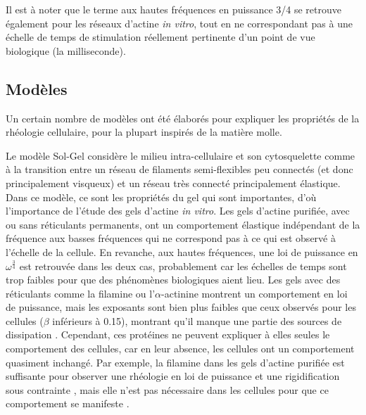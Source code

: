 Il est à noter que le terme aux hautes fréquences en puissance 3/4 se retrouve également pour les réseaux d'actine \textit{in vitro}, tout en ne correspondant pas à une échelle de temps de stimulation réellement pertinente d'un point de vue biologique (la milliseconde). 




\subsection{Modèles}

Un certain nombre de modèles ont été élaborés pour expliquer les propriétés de la rhéologie cellulaire, pour la plupart inspirés de la matière molle. 

Le modèle Sol-Gel considère le milieu intra-cellulaire et son cytosquelette comme à la transition entre un réseau de filaments semi-flexibles peu connectés (et donc principalement visqueux) et un réseau très connecté principalement élastique. 
Dans ce modèle, ce sont les propriétés du gel qui sont importantes,  d'où l'importance de l'étude des gels d'actine \textit{in vitro}. 
Les gels d'actine purifiée, avec ou sans réticulants permanents, ont un comportement élastique indépendant de la fréquence aux basses fréquences qui ne correspond pas à ce qui est observé à l'échelle de la cellule. 
En revanche, aux hautes fréquences, une loi de puissance en $\omega^{\frac{3}{4}}$ est retrouvée dans les deux cas, probablement car les échelles de temps sont trop faibles pour que des phénomènes biologiques aient lieu. 
Les gels avec des réticulants comme la filamine ou l'$\alpha$-actinine montrent un comportement en loi de puissance, mais les exposants sont bien plus faibles que ceux observés pour les cellules ($\beta$ inférieurs à 0.15), montrant qu'il manque une partie des sources de dissipation \parencite{gardel_stress-dependent_2006}.
Cependant, ces protéines ne peuvent expliquer à elles seules le comportement des cellules, car en leur absence, les cellules ont un comportement quasiment inchangé. Par exemple, la filamine dans les gels d'actine purifiée est suffisante pour observer une rhéologie en loi de puissance et une rigidification sous contrainte \parencite{gardel_stress-dependent_2006}, mais elle n'est pas nécessaire dans les cellules pour que ce comportement se manifeste \parencite{coughlin_filamin-and_2006}.

